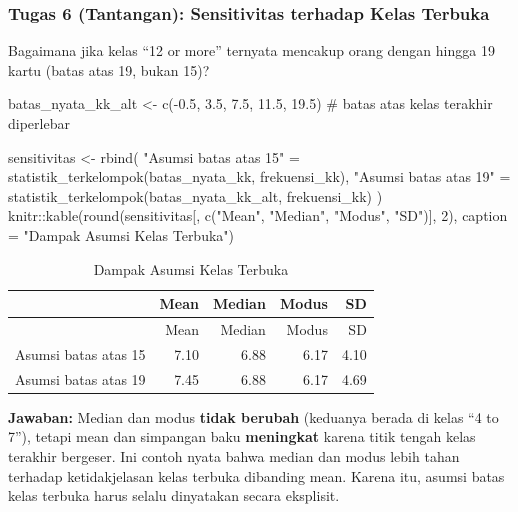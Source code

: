 \documentclass[
  indonesian,
  letterpaper,
]{book}
\newenvironment{Shaded}{\begin{snugshade}}{\end{snugshade}}
\newcommand{\AttributeTok}[1]{\textcolor[rgb]{0.40,0.45,0.13}{#1}}
\newcommand{\CommentTok}[1]{\textcolor[rgb]{0.37,0.37,0.37}{#1}}
\newcommand{\DecValTok}[1]{\textcolor[rgb]{0.68,0.00,0.00}{#1}}
\newcommand{\FloatTok}[1]{\textcolor[rgb]{0.68,0.00,0.00}{#1}}
\newcommand{\FunctionTok}[1]{\textcolor[rgb]{0.28,0.35,0.67}{#1}}
\newcommand{\NormalTok}[1]{\textcolor[rgb]{0.00,0.23,0.31}{#1}}
\newcommand{\OtherTok}[1]{\textcolor[rgb]{0.00,0.23,0.31}{#1}}
\newcommand{\SpecialCharTok}[1]{\textcolor[rgb]{0.37,0.37,0.37}{#1}}
\newcommand{\StringTok}[1]{\textcolor[rgb]{0.13,0.47,0.30}{#1}}
\begin{document}
\subsubsection{Tugas 6 (Tantangan): Sensitivitas terhadap Kelas
Terbuka}\label{tugas-6-tantangan-sensitivitas-terhadap-kelas-terbuka}

Bagaimana jika kelas ``12 or more'' ternyata mencakup orang dengan
hingga 19 kartu (batas atas 19, bukan 15)?

\begin{Shaded}
\begin{Highlighting}[]
\NormalTok{batas\_nyata\_kk\_alt }\OtherTok{\textless{}{-}} \FunctionTok{c}\NormalTok{(}\SpecialCharTok{{-}}\FloatTok{0.5}\NormalTok{, }\FloatTok{3.5}\NormalTok{, }\FloatTok{7.5}\NormalTok{, }\FloatTok{11.5}\NormalTok{, }\FloatTok{19.5}\NormalTok{)   }\CommentTok{\# batas atas kelas terakhir diperlebar}

\NormalTok{sensitivitas }\OtherTok{\textless{}{-}} \FunctionTok{rbind}\NormalTok{(}
\StringTok{"Asumsi batas atas 15"} \OtherTok{=} \FunctionTok{statistik\_terkelompok}\NormalTok{(batas\_nyata\_kk, frekuensi\_kk),}
\StringTok{"Asumsi batas atas 19"} \OtherTok{=} \FunctionTok{statistik\_terkelompok}\NormalTok{(batas\_nyata\_kk\_alt, frekuensi\_kk)}
\NormalTok{)}
\NormalTok{knitr}\SpecialCharTok{::}\FunctionTok{kable}\NormalTok{(}\FunctionTok{round}\NormalTok{(sensitivitas[, }\FunctionTok{c}\NormalTok{(}\StringTok{"Mean"}\NormalTok{, }\StringTok{"Median"}\NormalTok{, }\StringTok{"Modus"}\NormalTok{, }\StringTok{"SD"}\NormalTok{)], }\DecValTok{2}\NormalTok{),}
\AttributeTok{caption =} \StringTok{"Dampak Asumsi Kelas Terbuka"}\NormalTok{)}
\end{Highlighting}
\end{Shaded}

\begin{longtable}[]{@{}lrrrr@{}}
\caption{Dampak Asumsi Kelas Terbuka}\tabularnewline
\toprule\noalign{}
& Mean & Median & Modus & SD \\
\midrule\noalign{}
\endfirsthead
\toprule\noalign{}
& Mean & Median & Modus & SD \\
\midrule\noalign{}
\endhead
\bottomrule\noalign{}
\endlastfoot
Asumsi batas atas 15 & 7.10 & 6.88 & 6.17 & 4.10 \\
Asumsi batas atas 19 & 7.45 & 6.88 & 6.17 & 4.69 \\
\end{longtable}

\textbf{Jawaban:} Median dan modus \textbf{tidak berubah} (keduanya
berada di kelas ``4 to 7''), tetapi mean dan simpangan baku
\textbf{meningkat} karena titik tengah kelas terakhir bergeser. Ini
contoh nyata bahwa median dan modus lebih tahan terhadap ketidakjelasan
kelas terbuka dibanding mean. Karena itu, asumsi batas kelas terbuka
harus selalu dinyatakan secara eksplisit.
\end{document}

